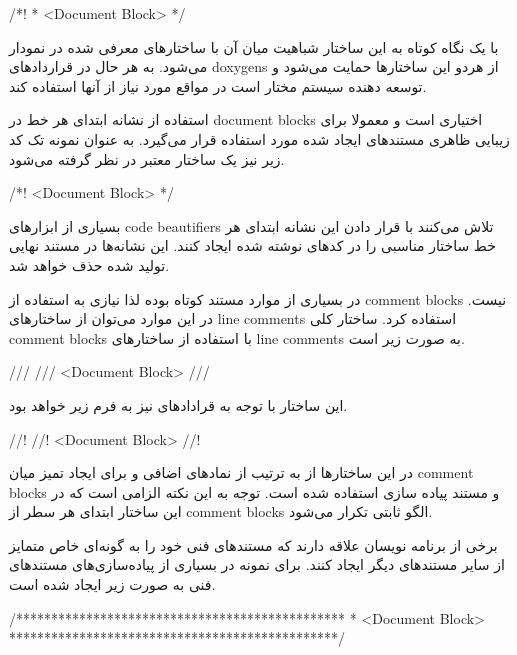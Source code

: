 \begin{C++}
/*!
 * <Document Block>
 */
\end{C++}

با یک نگاه کوتاه به این ساختار شباهیت میان آ‌ن با ساختارهای
معرفی شده در  نمودار می‌شود. به هر حال در قراردادهای \glspl{doxygen}
از هردو این ساختارها حمایت می‌شود و توسعه دهنده سیستم مختار است در مواقع مورد
نیاز از آنها استفاده کند.

\begin{note}
استفاده از نشانه \lr{*} ابتدای هر خط در \glspl{document block} اختیاری است و
معمولا برای زیبایی ظاهری مستند‌های ایجاد شده مورد استفاده قرار می‌گیرد. به عنوان
نمونه تک کد زیر نیز یک ساختار معتبر در نظر گرفته می‌شود.

\begin{C++}
/*!
   <Document Block>
 */
\end{C++}

بسیاری از ابزارهای \glspl{code beautifier} تلاش می‌کنند با قرار دادن این نشانه
ابتدای هر خط ساختار مناسبی را در کدهای نوشته شده ایجاد کنند. این نشانه‌ها در
مستند نهایی تولید شده حذف خواهد شد.
\end{note}

در بسیاری از موارد مستند کوتاه بوده لذا نیازی به استفاده از \glspl{comment
block} نیست. در این موارد می‌توان از ساختارهای \glspl{line comment} استفاده
کرد. ساختار کلی \glspl{comment block} با استفاده از ساختارهای \glspl{line
comment} به صورت زیر است.

\begin{C++}
///
/// <Document Block>
///
\end{C++}

این ساختار با توجه به قرادادهای  نیز به فرم زیر خواهد بود.

\begin{C++}
//!
//! <Document Block>
//!
\end{C++}

در این ساختارها از به ترتیب از نمادهای اضافی \lr{/} و \lr{!} برای ایجاد تمیز
میان \glspl{comment block} و مستند پیاده سازی استفاده شده است. توجه به این نکته
الزامی است که در این ساختار ابتدای هر سطر از \glspl{comment block} الگو ثابتی
تکرار می‌شود.

برخی از برنامه نویسان علاقه دارند که مستندهای فنی خود را به گونه‌ای خاص متمایز
از سایر مستندهای دیگر ایجاد کنند. برای نمونه در بسیاری از پیاده‌سازی‌های
مستندهای فنی به صورت زیر ایجاد شده است.

\begin{C++}
/***********************************************
 *  <Document Block>
 ***********************************************/
\end{C++}

